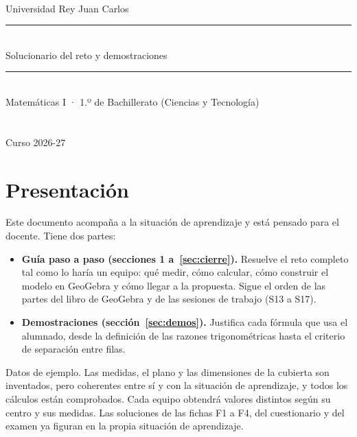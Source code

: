 \documentclass[10pt,a4paper]{article}
\newcounter{res}
\begin{document}
\thispagestyle{empty}
\vspace*{3.2cm}
\begin{center}
  {\small\color{pistagris}\MakeUppercase{\master}\\ Universidad Rey Juan Carlos}\\[1.4em]
  {\color{urjc}\rule{\linewidth}{1.2pt}}\\[1.2em]
  {\fontsize{13}{16}\selectfont\color{titular} Solucionario del reto y demostraciones}\\[0.8em]
  {\fontsize{25}{31}\selectfont\bfseries\color{titular}\tituloSA\par}
  \vspace{1em}
  {\color{urjc}\rule{\linewidth}{1.2pt}}\\[1.4em]
  {\large Matemáticas I · 1.º de Bachillerato (Ciencias y Tecnología)}\\[0.4em]
  {\large\color{pistagris}\asignatura}\\[3em]
  {\large\bfseries\autor}\\[0.4em]
  {\small\color{pistagris}Curso 2026-27}
\end{center}
\clearpage

{\setlength{\parskip}{0pt}\tableofcontents}
\clearpage

\section*{Presentación}

Este documento acompaña a la situación de aprendizaje y está pensado para el docente. Tiene dos partes:

\begin{itemize}
  \item \textbf{Guía paso a paso (secciones 1 a~\ref{sec:cierre}).} Resuelve el reto completo tal como lo haría un equipo: qué medir, cómo calcular, cómo construir el modelo en GeoGebra y cómo llegar a la propuesta. Sigue el orden de las partes del libro de GeoGebra y de las sesiones de trabajo (S13 a S17).
  \item \textbf{Demostraciones (sección~\ref{sec:demos}).} Justifica cada fórmula que usa el alumnado, desde la definición de las razones trigonométricas hasta el criterio de separación entre filas.
\end{itemize}

\begin{nota}{Datos de ejemplo.}
Las medidas, el plano y las dimensiones de la cubierta son inventados, pero coherentes entre sí y con la situación de aprendizaje, y todos los cálculos están comprobados. Cada equipo obtendrá valores distintos según su centro y sus medidas. Las soluciones de las fichas F1 a F4, del cuestionario y del examen ya figuran en la propia situación de aprendizaje.
\end{nota}
\end{document}
